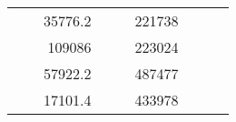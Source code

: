 \begin{table}[H]
\begin{tabular}{|ccrccrccc}
\multicolumn{1}{|c|}{\cellcolor[HTML]{FFFFC7}}                                & \multicolumn{1}{c|}{\cellcolor[HTML]{DAE8FC}}                      & \multicolumn{1}{r|}{\cellcolor[HTML]{DAE8FC}35776.2}   & \multicolumn{1}{c|}{\cellcolor[HTML]{FFFFC7}}                                & \multicolumn{1}{c|}{\cellcolor[HTML]{DAE8FC}}                       & \multicolumn{1}{r|}{\cellcolor[HTML]{DDFDFF}221738}    &                                                                              &                                                                    &                                                        \\ \cline{3-3} \cline{6-6}
\multicolumn{1}{|c|}{\cellcolor[HTML]{FFFFC7}}                                & \multicolumn{1}{c|}{\cellcolor[HTML]{DAE8FC}}                      & \multicolumn{1}{r|}{\cellcolor[HTML]{DDFDFF}109086}    & \multicolumn{1}{c|}{\cellcolor[HTML]{FFFFC7}}                                & \multicolumn{1}{c|}{\cellcolor[HTML]{DAE8FC}}                       & \multicolumn{1}{r|}{\cellcolor[HTML]{DAE8FC}223024}    &                                                                              &                                                                    &                                                        \\ \cline{3-3} \cline{6-6}
\multicolumn{1}{|c|}{\cellcolor[HTML]{FFFFC7}}                                & \multicolumn{1}{c|}{\cellcolor[HTML]{DAE8FC}}                      & \multicolumn{1}{r|}{\cellcolor[HTML]{DAE8FC}57922.2}   & \multicolumn{1}{c|}{\cellcolor[HTML]{FFFFC7}}                                & \multicolumn{1}{c|}{\cellcolor[HTML]{DAE8FC}}                       & \multicolumn{1}{r|}{\cellcolor[HTML]{DDFDFF}487477}    &                                                                              &                                                                    &                                                        \\ \cline{3-3} \cline{6-6}
\multicolumn{1}{|c|}{\cellcolor[HTML]{FFFFC7}}                                & \multicolumn{1}{c|}{\cellcolor[HTML]{DAE8FC}}                      & \multicolumn{1}{r|}{\cellcolor[HTML]{DDFDFF}17101.4}   & \multicolumn{1}{c|}{\cellcolor[HTML]{FFFFC7}}                                & \multicolumn{1}{c|}{\cellcolor[HTML]{DAE8FC}}                       & \multicolumn{1}{r|}{\cellcolor[HTML]{DAE8FC}433978}    &                                                                              &                                                                    &                                                        \\ \cline{3-3} \cline{6-6}

\end{tabular}
\end{table}
